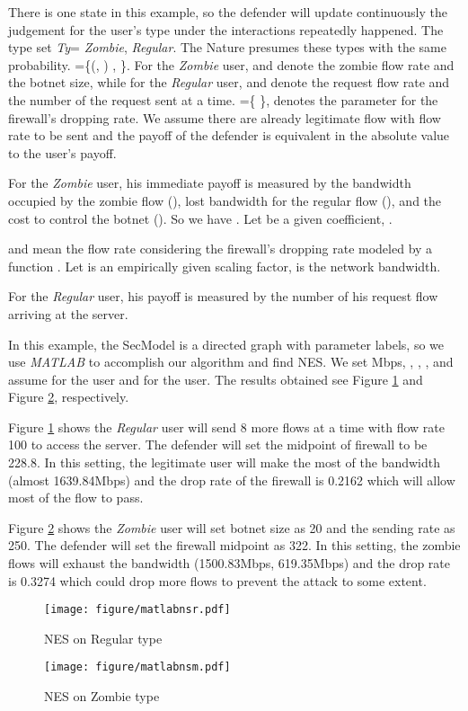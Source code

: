 \documentclass[10pt, conference, compsocconf]{IEEEtran}
\begin{document}
There is one state  in this example, so the defender will update continuously the judgement for the user's type under the  interactions repeatedly happened.
The type set {\it Ty}= {\it Zombie}, {\it Regular}.
The Nature presumes these types with the same probability.
=\{(, )  , \}.
For the {\it Zombie} user,  and  denote the zombie flow rate and the botnet size, while for the {\it Regular} user,  and  denote the request flow rate and the number of the request sent at a time.
=\{  \},  denotes the parameter for the firewall's dropping rate.
We assume there are already  legitimate flow with flow rate  to be sent and the payoff of the defender is equivalent in the absolute value to the user's payoff.

For the \textit{Zombie} user, his immediate payoff is measured by the bandwidth occupied by the zombie flow (), lost bandwidth  for the regular flow (), and the cost to control the botnet (). So we have . Let  be a given coefficient, .

\begin{footnotesize}

\end{footnotesize}
 and  mean the flow rate considering the firewall's dropping rate modeled by a function  \cite{harkeerat}. Let  is an empirically given scaling factor,  is the network bandwidth.
\begin{footnotesize}

\end{footnotesize}

For the \textit{Regular} user, his payoff is measured by the number of his request flow arriving at the server.


In this example, the SecModel is a directed graph with parameter labels, so we use {\it MATLAB} to accomplish our algorithm and find NES.
We set Mbps, , , ,  and assume  for the  user and  for the  user.
The results obtained see Figure \ref{nes3} and Figure \ref{nes4}, respectively.

Figure \ref{nes3} shows the \textit{Regular} user will send 8 more flows at a time with flow rate 100 to access the server. The defender will set the midpoint of firewall to be 228.8.
In this setting, the legitimate user will make the most of the bandwidth (almost 1639.84Mbps) and the drop rate of the firewall is 0.2162 which will allow most of the flow to pass.

Figure \ref{nes4} shows the \textit{Zombie} user will set botnet size as 20 and the sending rate as 250.
The defender will set the firewall midpoint as 322.
In this setting, the zombie flows will exhaust the bandwidth (1500.83Mbps, 619.35Mbps) and the drop rate is 0.3274 which could drop more flows to prevent the attack to some extent.
\begin{figure}[h]
\centering
\texttt{[image: figure/matlabnsr.pdf]}
\caption{NES on Regular type}
\label{nes3}
\end{figure}
\begin{figure}[h]
\centering
\texttt{[image: figure/matlabnsm.pdf]}
\caption{NES on Zombie type}
\label{nes4}
\end{figure}
\end{document}
